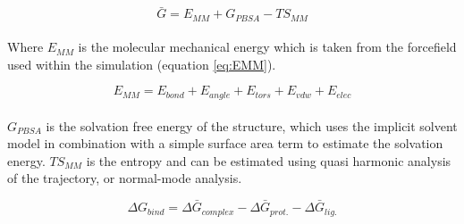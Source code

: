     \begin{equation}\label{eq:G}
        \bar{G} = E_{MM} + G_{PBSA} -TS_{MM}
    \end{equation}

    \paragraph{}
        Where $E_{MM}$ is the molecular mechanical energy which is taken from the forcefield used within the simulation (equation \ref{eq:EMM}).

    \begin{equation}\label{eq:EMM}
        E_{MM} = E_{bond} + E_{angle} + E_{tors} + E_{vdw} + E_{elec}
    \end{equation}

    \paragraph{}
        $G_{PBSA}$ is the solvation free energy of the structure, which uses the implicit solvent model in combination with a simple surface area term to estimate the solvation energy. $TS_{MM}$ is the entropy and can be estimated using quasi harmonic analysis of the trajectory, or normal-mode analysis.
        
    \begin{equation}\label{eq:GBSA}
        \Delta G_{bind} = \Delta \bar{G}_{complex} - \Delta \bar{G}_{prot.} - \Delta \bar{G}_{lig.}
    \end{equation}